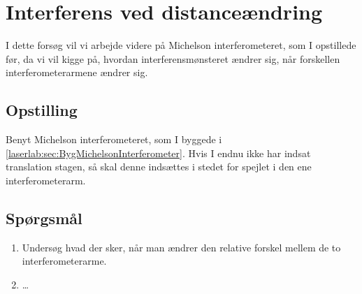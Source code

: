 \section{Interferens ved distanceændring}

I dette forsøg vil vi arbejde videre på Michelson interferometeret, som I opstillede før, da vi vil kigge på, hvordan interferensmønsteret ændrer sig, når forskellen interferometerarmene ændrer sig.


\subsection{Opstilling}

Benyt Michelson interferometeret, som I byggede i \cref{laserlab:sec:BygMichelsonInterferometer}. Hvis I endnu ikke har indsat translation stagen, så skal denne indsættes i stedet for spejlet i den ene interferometerarm.


\subsection{Spørgsmål}

\begin{enumerate}
    \item Undersøg hvad der sker, når man ændrer den relative forskel mellem de to interferometerarme.
    \item \ldots
\end{enumerate}
